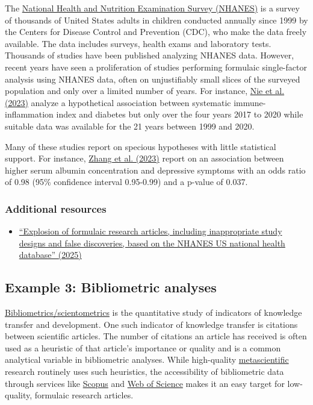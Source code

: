\documentclass[letterpaper, 12pt]{article}
\begin{document}
The \href{https://www.cdc.gov/nchs/nhanes/index.html}{National Health and Nutrition Examination Survey (NHANES)} is a survey of thousands of United States adults in children conducted annually since 1999 by the Centers for Disease Control and Prevention (CDC), who make the data freely available. The data includes surveys, health exams and laboratory tests. Thousands of studies have been published analyzing NHANES data. However, recent years have seen a proliferation of studies performing formulaic single-factor analysis using NHANES data, often on unjustifiably small slices of the surveyed population and only over a limited number of years. For instance, \href{https://doi.org/10.3389/fendo.2023.1245199}{Nie et al. (2023)} analyze a hypothetical association between systematic immune-inflammation index and diabetes but only over the four years 2017 to 2020 while suitable data was available for the 21 years between 1999 and 2020.

Many of these studies report on specious hypotheses with little statistical support. For instance, \href{https://doi.org/10.1186/s12888-023-04935-1}{Zhang et al. (2023)} report on an association between higher serum albumin concentration and depressive symptoms with an odds ratio of 0.98 (95\% confidence interval 0.95-0.99) and a p-value of 0.037.

\subsubsection*{Additional resources}

\begin{itemize}
    \setlength\itemsep{-0.5em}
    \item \href{https://doi.org/10.1371/journal.pbio.3003152}{``Explosion of formulaic research articles, including inappropriate study designs and false discoveries, based on the NHANES US national health database'' (2025)}
\end{itemize}

\subsection*{Example 3: Bibliometric analyses}

\href{https://en.wikipedia.org/wiki/Bibliometrics}{Bibliometrics/scientometrics} is the quantitative study of indicators of knowledge transfer and development. One such indicator of knowledge transfer is citations between scientific articles. The number of citations an article has received is often used as a heuristic of that article's importance or quality and is a common analytical variable in bibliometric analyses. While high-quality \href{https://en.wikipedia.org/wiki/Metascience}{metascientific} research routinely uses such heuristics, the accessibility of bibliometric data through services like \href{https://scopus.com}{Scopus} and \href{/https://webofscience.com/}{Web of Science} makes it an easy target for low-quality, formulaic research articles. 
\end{document}
